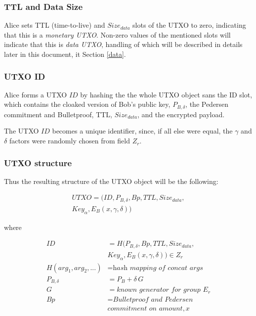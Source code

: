 \documentclass[a4paper, 10pt, conference]{ieeeconf}
\begin{document}
\subsubsection{TTL and Data Size} Alice sets TTL (time-to-live) and $Size_{data}$ slots of the UTXO to zero, indicating that this is a \textit{monetary UTXO}. Non-zero values of the mentioned slots will indicate that this is \textit{data UTXO}, handling of which will be described in details later in this document, it Section \ref{data}.

\subsubsection{UTXO ID} Alice forms a UTXO $\mathit{ID}$ by hashing the the whole UTXO object sans the ID slot, which contains the cloaked version of Bob's public key, $P_{B, \delta}$, the Pedersen commitment and Bulletproof, TTL, $Size_{data}$, and the encrypted payload.

The UTXO $\mathit{ID}$ becomes a unique identifier, since, if all else were equal, the $\gamma$ and $\delta$ factors were randomly chosen from field $Z_r$.

\subsubsection{UTXO structure}

Thus the resulting structure of the UTXO object will be the following:

\begin{multline*}
UTXO = (ID, P_{B, \delta}, Bp, TTL, Size_{data},\\
        Key_{\alpha}, E_B(x, \gamma, \delta))
\end{multline*}

where

\begin{align*}
ID &= H(P_{B, \delta}, Bp, TTL, Size_{data}, \\ 
   & Key_{\alpha}, E_B(x, \gamma, \delta)) \in Z_r \\
H(arg_1, arg_2, ...) &= \textit{hash mapping of concat args} \\
P_{B, \delta} &= P_B + \delta \, G \\
G &= \textit{known generator for group } E_r \\
Bp &= \textit{Bulletproof and Pedersen} \\
& \textit{commitment on amount}, x 
\end{align*}
\end{document}
